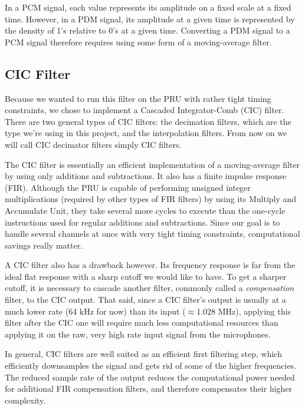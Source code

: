 \documentclass[]{report}
\begin{document}
In a PCM signal, each value represents its amplitude on a fixed scale at a fixed time. However, in a PDM signal, its amplitude at a given time is represented by the density of 1's relative to 0's at a given time. Converting a PDM signal to a PCM signal therefore requires using some form of a moving-average filter.

\hypertarget{cic-filter}{%
\subsection{CIC Filter}\label{cic-filter}}

Because we wanted to run this filter on the PRU with rather tight timing constraints, we chose to implement a Cascaded Integrator-Comb (CIC) filter. There are two general types of CIC filters: the decimation filters, which are the type we're using in this project, and the interpolation filters. From now on we will call CIC decimator filters simply CIC filters.

The CIC filter is essentially an efficient implementation of a moving-average filter by using only additions and subtractions. It also has a finite impulse response (FIR). Although the PRU is capable of performing unsigned integer multiplications (required by other types of FIR filters) by using its Multiply and Accumulate Unit, they take several more cycles to execute than the one-cycle instructions used for regular additions and subtractions. Since our goal is to handle several channels at once with very tight timing constraints, computational savings really matter.

A CIC filter also has a drawback however. Its frequency response is far from the ideal flat response with a sharp cutoff we would like to have. To get a sharper cutoff, it is necessary to cascade another filter, commonly called a \emph{compensation} filter, to the CIC output. That said, since a CIC filter's output is usually at a much lower rate (64 kHz for now) than its input ($ \approx $1.028 MHz), applying this filter after the CIC one will require much less computational resources than applying it on the raw, very high rate input signal from the microphones.

In general, CIC filters are well suited as an efficient first filtering step, which efficiently downsamples the signal and gets rid of some of the higher frequencies. The reduced sample rate of the output reduces the computational power needed for additional FIR compensation filters, and therefore compensates their higher complexity.
\end{document}
